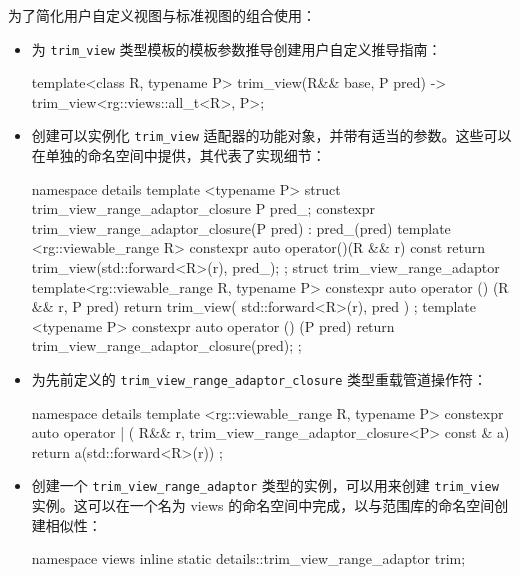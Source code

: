 为了简化用户自定义视图与标准视图的组合使用：

\begin{itemize}
\item
为 \verb|trim_view| 类型模板的模板参数推导创建用户自定义推导指南：

\begin{cpp}
template<class R, typename P>
trim_view(R&& base, P pred)
    -> trim_view<rg::views::all_t<R>, P>;
\end{cpp}

\item
创建可以实例化 \verb|trim_view| 适配器的功能对象，并带有适当的参数。这些可以在单独的命名空间中提供，其代表了实现细节：

\begin{cpp}
namespace details
{
    template <typename P>
    struct trim_view_range_adaptor_closure
    {
        P pred_;
        constexpr trim_view_range_adaptor_closure(P pred)
        : pred_(pred)
        {}
        template <rg::viewable_range R>
        constexpr auto operator()(R && r) const
        {
            return trim_view(std::forward<R>(r), pred_);
        }
    };
    struct trim_view_range_adaptor
    {
        template<rg::viewable_range R, typename P>
        constexpr auto operator () (R && r, P pred)
        {
            return trim_view( std::forward<R>(r), pred ) ;
        }
        template <typename P>
        constexpr auto operator () (P pred)
        {
            return trim_view_range_adaptor_closure(pred);
        }
    };
}
\end{cpp}

\item
为先前定义的 \verb|trim_view_range_adaptor_closure| 类型重载管道操作符：

\begin{cpp}
namespace details
{
    template <rg::viewable_range R, typename P>
    constexpr auto operator | (
        R&& r,
        trim_view_range_adaptor_closure<P> const & a)
    {
        return a(std::forward<R>(r)) ;
    }
}
\end{cpp}

\item
创建一个 \verb|trim_view_range_adaptor| 类型的实例，可以用来创建 \verb|trim_view| 实例。这可以在一个名为 views 的命名空间中完成，以与范围库的命名空间创建相似性：

\begin{cpp}
namespace views
{
    inline static details::trim_view_range_adaptor trim;
}
\end{cpp}
\end{itemize}

